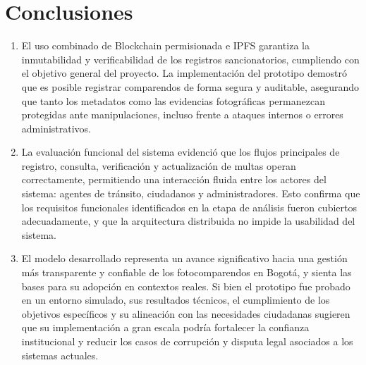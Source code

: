 \documentclass[
    letterpaper, 
    man,   
    spanish,
    12pt,
    donotrepeattitle,
    floatsintext,
    hidelinks %
]{apa7}
\begin{document}
\section{Conclusiones}
\begin{enumerate}
    \item El uso combinado de Blockchain permisionada e IPFS garantiza la inmutabilidad y verificabilidad de los registros sancionatorios, cumpliendo con el objetivo general del proyecto. La implementación del prototipo demostró que es posible registrar comparendos de forma segura y auditable, asegurando que tanto los metadatos como las evidencias fotográficas permanezcan protegidas ante manipulaciones, incluso frente a ataques internos o errores administrativos.
    \item La evaluación funcional del sistema evidenció que los flujos principales de registro, consulta, verificación y actualización de multas operan correctamente, permitiendo una interacción fluida entre los actores del sistema: agentes de tránsito, ciudadanos y administradores. Esto confirma que los requisitos funcionales identificados en la etapa de análisis fueron cubiertos adecuadamente, y que la arquitectura distribuida no impide la usabilidad del sistema.
    \item El modelo desarrollado representa un avance significativo hacia una gestión más transparente y confiable de los fotocomparendos en Bogotá, y sienta las bases para su adopción en contextos reales. Si bien el prototipo fue probado en un entorno simulado, sus resultados técnicos, el cumplimiento de los objetivos específicos y su alineación con las necesidades ciudadanas sugieren que su implementación a gran escala podría fortalecer la confianza institucional y reducir los casos de corrupción y disputa legal asociados a los sistemas actuales.
\end{enumerate}



\printbibliography[
    heading=bibintoc,
    title={Referencias}
]
\end{document}
